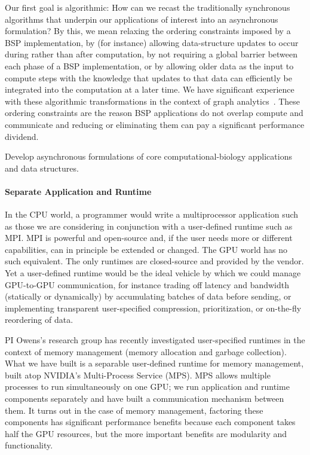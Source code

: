 Our first goal is algorithmic: How can we recast the traditionally synchronous algorithms that underpin our applications of interest into an asynchronous formulation? By this, we mean relaxing the ordering constraints imposed by a BSP implementation, by (for instance) allowing data-structure updates to occur during rather than after computation, by not requiring a global barrier between each phase of a BSP implementation, or by allowing older data as the input to compute steps with the knowledge that updates to that data can efficiently be integrated into the computation at a later time. We have significant experience with these algorithmic transformations in the context of graph analytics~\cite{Chen:2022:AAT,Chen:2022:SIP}. These ordering constraints are the reason BSP applications do not overlap compute and communicate and reducing or eliminating them can pay a significant performance dividend.

\begin{rproblem}
Develop asynchronous formulations of core computational-biology applications and data structures.
\end{rproblem}

\paragraph{Separate Application and Runtime}

In the CPU world, a programmer would write a multiprocessor application such as those we are considering in conjunction with a user-defined runtime such as MPI\@. MPI is powerful and open-source and, if the user needs more or different capabilities, can in principle be extended or changed. The GPU world has no such equivalent. The only runtimes are closed-source and provided by the vendor. Yet a user-defined runtime would be the ideal vehicle by which we could manage GPU-to-GPU communication, for instance trading off latency and bandwidth (statically or dynamically) by accumulating batches of data before sending, or implementing transparent user-specified compression, prioritization, or on-the-fly reordering of data.

PI Owens's research group has recently investigated user-specified runtimes in the context of memory management (memory allocation and garbage collection). What we have built is a separable user-defined runtime for memory management, built atop NVIDIA's Multi-Process Service (MPS)\@. MPS allows multiple processes to run simultaneously on one GPU; we run application and runtime components separately and have built a communication mechanism between them. It turns out in the case of memory management, factoring these components has significant performance benefits because each component takes half the GPU resources, but the more important benefits are modularity and functionality.

